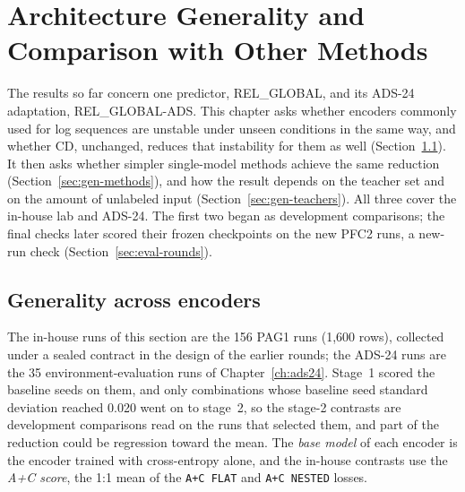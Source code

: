 \chapter{Architecture Generality and Comparison with Other Methods}
\label{ch:generality}

The results so far concern one predictor, REL\_GLOBAL, and its ADS-24
adaptation, REL\_GLOBAL-ADS. This chapter asks whether encoders
commonly used for log sequences are unstable under unseen conditions in
the same way, and whether CD, unchanged, reduces that
instability for them as well (Section~\ref{sec:gen-arch}). It then asks
whether simpler single-model methods achieve the same reduction
(Section~\ref{sec:gen-methods}), and how the result depends on the
teacher set and on the amount of unlabeled input
(Section~\ref{sec:gen-teachers}). All three cover the in-house lab and
ADS-24. The first two began as development comparisons; the final
checks later scored their frozen checkpoints on the new PFC2 runs, a
new-run check (Section~\ref{sec:eval-rounds}).

\section{Generality across encoders}
\label{sec:gen-arch}

The in-house runs of this section are the 156 PAG1 runs (1,600 rows),
collected under a sealed contract in the design of the earlier rounds;
the ADS-24 runs are the 35 environment-evaluation runs of
Chapter~\ref{ch:ads24}. Stage~1 scored the baseline seeds on them, and
only combinations whose baseline seed standard deviation reached 0.020
went on to stage~2, so the stage-2 contrasts are development
comparisons read on the runs that selected them, and part of the
reduction could be regression toward the mean. The \emph{base model}
of each encoder is the encoder trained with cross-entropy alone, and
the in-house contrasts use the \emph{A+C score}, the 1:1 mean of the
\texttt{A+C FLAT} and \texttt{A+C NESTED} losses.


